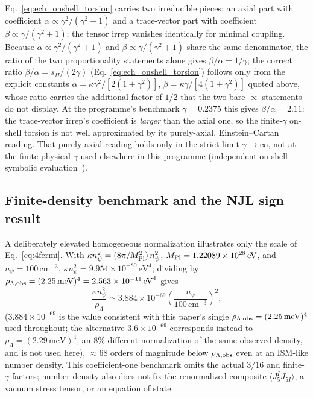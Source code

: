 \documentclass[aps,prd,twocolumn,superscriptaddress,preprintnumbers,nofootinbib,longbibliography,floatfix]{revtex4-2}
\newcommand{\MPl}{M_{\rm Pl}}
\begin{document}
Eq.~\eqref{eq:ech_onshell_torsion} carries two irreducible pieces: an
axial part with coefficient $\alpha\propto\gamma^2/(\gamma^2+1)$ and a
trace-vector part with coefficient $\beta\propto\gamma/(\gamma^2+1)$; the
tensor irrep vanishes identically for minimal coupling. Because
$\alpha\propto\gamma^2/(\gamma^2+1)$ and $\beta\propto\gamma/(\gamma^2+1)$
share the same denominator, the ratio of the two proportionality
statements alone gives $\beta/\alpha=1/\gamma$; the correct ratio
$\beta/\alpha=s_H/(2\gamma)$ (Eq.~\eqref{eq:ech_onshell_torsion}) follows
only from the explicit constants $\alpha=\kappa\gamma^2/[2(1+\gamma^2)]$,
$\beta=\kappa\gamma/[4(1+\gamma^2)]$ quoted above, whose ratio carries the
additional factor of $1/2$ that the two bare $\propto$ statements do not
display. At the programme's benchmark $\gamma=0.2375$ this gives
$\beta/\alpha=2.11$: the trace-vector irrep's coefficient is
\emph{larger} than the axial one, so the finite-$\gamma$ on-shell torsion
is not well approximated by its purely-axial, Einstein--Cartan reading.
That purely-axial reading holds only in the strict limit
$\gamma\to\infty$, not at the finite physical $\gamma$ used elsewhere in
this programme (independent on-shell symbolic
evaluation~\cite{TorsionOnshell2026}).

\subsection{Finite-density benchmark and the NJL sign result}

A deliberately elevated homogeneous normalization illustrates only the
scale of Eq.~\eqref{eq:4fermi}. With
$\kappa n_\psi^2=(8\pi/\MPl^2)\,n_\psi^2$,
$\MPl=1.22089\times10^{28}\,\mathrm{eV}$, and $n_\psi=100\,\mathrm{cm}^{-3}$,
$\kappa n_\psi^2=9.954\times10^{-80}\,\mathrm{eV}^4$; dividing by
$\rho_{\Lambda,\rm obs}=(2.25\,\mathrm{meV})^4=2.563\times10^{-11}\,\mathrm{eV}^4$
gives
\begin{equation}
\frac{\kappa n_\psi^2}{\rho_\Lambda}\simeq
3.884\times10^{-69}\left(\frac{n_\psi}{100\,\mathrm{cm}^{-3}}\right)^2,
\end{equation}
($3.884\times10^{-69}$ is the value consistent with this paper's single
$\rho_{\Lambda,\rm obs}=(2.25\,\mathrm{meV})^4$ used throughout; the
alternative $3.6\times10^{-69}$ corresponds instead to
$\rho_\Lambda=(2.29\,\mathrm{meV})^4$, an 8\%-different normalization of
the same observed density, and is not used here),
${\approx}68$ orders of magnitude below $\rho_{\Lambda,\rm obs}$ even at
an ISM-like number density. This coefficient-one benchmark omits the
actual $3/16$ and finite-$\gamma$ factors; number density also does not
fix the renormalized composite $\langle J_5^I J_{5I}\rangle$, a vacuum
stress tensor, or an equation of state.
\end{document}
